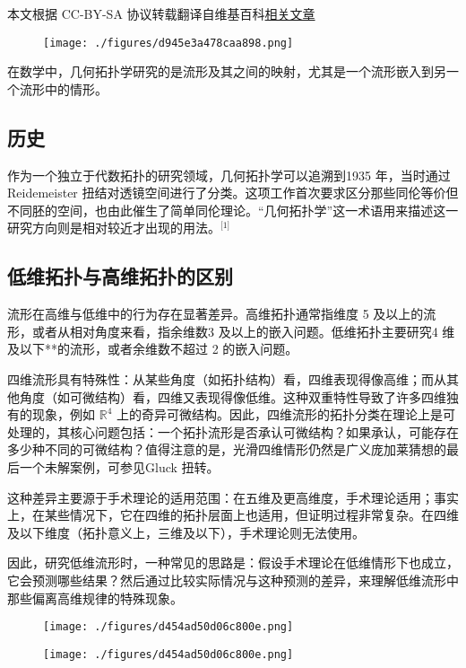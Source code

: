 
本文根据 CC-BY-SA 协议转载翻译自维基百科\href{https://en.wikipedia.org/wiki/Geometric_topology}{相关文章}

\begin{figure}[ht]
\centering
\texttt{[image: ./figures/d945e3a478caa898.png]}
\caption{} \label{fig_JHtpx_1}
\end{figure}
在数学中，几何拓扑学研究的是流形及其之间的映射，尤其是一个流形嵌入到另一个流形中的情形。
\subsection{历史}
作为一个独立于代数拓扑的研究领域，几何拓扑学可以追溯到1935 年，当时通过Reidemeister 扭结对透镜空间进行了分类。这项工作首次要求区分那些同伦等价但不同胚的空间，也由此催生了简单同伦理论。“几何拓扑学”这一术语用来描述这一研究方向则是相对较近才出现的用法。\(^\text{[1]}\)
\subsection{低维拓扑与高维拓扑的区别}
流形在高维与低维中的行为存在显著差异。高维拓扑通常指维度 5 及以上的流形，或者从相对角度来看，指余维数3 及以上的嵌入问题。低维拓扑主要研究4 维及以下**的流形，或者余维数不超过 2 的嵌入问题。


四维流形具有特殊性：从某些角度（如拓扑结构）看，四维表现得像高维；而从其他角度（如可微结构）看，四维又表现得像低维。这种双重特性导致了许多四维独有的现象，例如 $\mathbb{R}^4$ 上的奇异可微结构。因此，四维流形的拓扑分类在理论上是可处理的，其核心问题包括：一个拓扑流形是否承认可微结构？如果承认，可能存在多少种不同的可微结构？值得注意的是，光滑四维情形仍然是广义庞加莱猜想的最后一个未解案例，可参见Gluck 扭转。

这种差异主要源于手术理论的适用范围：在五维及更高维度，手术理论适用；事实上，在某些情况下，它在四维的拓扑层面上也适用，但证明过程非常复杂。在四维及以下维度（拓扑意义上，三维及以下），手术理论则无法使用。

因此，研究低维流形时，一种常见的思路是：假设手术理论在低维情形下也成立，它会预测哪些结果？然后通过比较实际情况与这种预测的差异，来理解低维流形中那些偏离高维规律的特殊现象。
\begin{figure}[ht]
\centering
\texttt{[image: ./figures/d454ad50d06c800e.png]}
\caption{} \label{fig_JHtpx_2}
\end{figure}\begin{figure}[ht]
\centering
\texttt{[image: ./figures/d454ad50d06c800e.png]}
\caption{} \label{fig_JHtpx_3}
\end{figure}